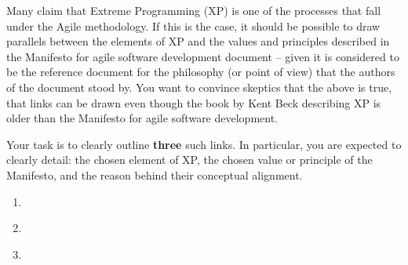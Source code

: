 
\pgfmathsetmacro{}

 Many claim that Extreme Programming (XP) is one of the processes that fall under the Agile methodology.  If this is the case, it should be possible to draw parallels between the elements of XP and the values and principles described in the Manifesto for agile software development document -- given it is considered to be the reference document for the philosophy (or point of view) that the authors of the document stood by.  
You want to convince skeptics that the above is true, that links can be drawn even though the book by Kent Beck describing XP is older than the Manifesto for agile software development. 

Your task is to clearly outline \textbf{three} such links.  In particular, you are expected to clearly detail: the chosen element of XP, the chosen value or principle of the Manifesto, and the reason behind their conceptual alignment. 

\begin{enumerate}[a]
	\item \ %
		\ifdefined\questionThirteenAnswerA
		  \newline\answer\questionThirteenAnswerA
		\else
		\fi


	\item \ %
		\ifdefined\questionThirteenAnswerB
		  \newline\answer\questionThirteenAnswerB
		\else
		\fi


	\item \ %
		\ifdefined\questionThirteenAnswerC
		  \newline\answer\questionThirteenAnswerC
		\else
		\fi

\end{enumerate}


